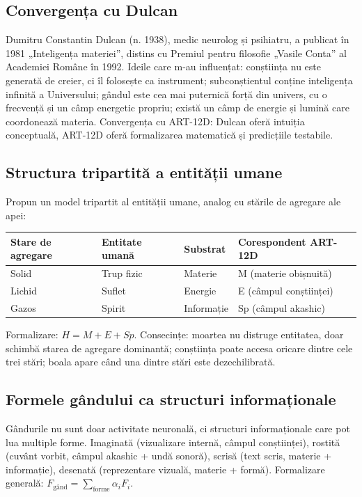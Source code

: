 \documentclass[11pt,a4paper]{article}
\begin{document}
\subsection{Convergența cu Dulcan}
Dumitru Constantin Dulcan (n. 1938), medic neurolog și psihiatru, a publicat în 1981 „Inteligența materiei”, distins cu Premiul pentru filosofie „Vasile Conta” al Academiei Române în 1992. Ideile care m-au influențat: conștiința nu este generată de creier, ci îl folosește ca instrument; subconștientul conține inteligența infinită a Universului; gândul este cea mai puternică forță din univers, cu o frecvență și un câmp energetic propriu; există un câmp de energie și lumină care coordonează materia. Convergența cu ART-12D: Dulcan oferă intuiția conceptuală, ART-12D oferă formalizarea matematică și predicțiile testabile.

\subsection{Structura tripartită a entității umane}
Propun un model tripartit al entității umane, analog cu stările de agregare ale apei:
\begin{table}[H]
\centering
\begin{tabular}{@{}llll@{}}
\toprule
\textbf{Stare de agregare} & \textbf{Entitate umană} & \textbf{Substrat} & \textbf{Corespondent ART-12D} \\ \midrule
Solid & Trup fizic & Materie & M (materie obișnuită) \\
Lichid & Suflet & Energie & E (câmpul conștiinței) \\
Gazos & Spirit & Informație & Sp (câmpul akashic) \\ \bottomrule
\end{tabular}
\end{table}
Formalizare: $H = M + E + Sp$. Consecințe: moartea nu distruge entitatea, doar schimbă starea de agregare dominantă; conștiința poate accesa oricare dintre cele trei stări; boala apare când una dintre stări este dezechilibrată.

\subsection{Formele gândului ca structuri informaționale}
Gândurile nu sunt doar activitate neuronală, ci structuri informaționale care pot lua multiple forme. Imaginată (vizualizare internă, câmpul conștiinței), rostită (cuvânt vorbit, câmpul akashic + undă sonoră), scrisă (text scris, materie + informație), desenată (reprezentare vizuală, materie + formă). Formalizare generală: $F_{\text{gând}} = \sum_{\text{forme}} \alpha_i F_i$.
\end{document}
